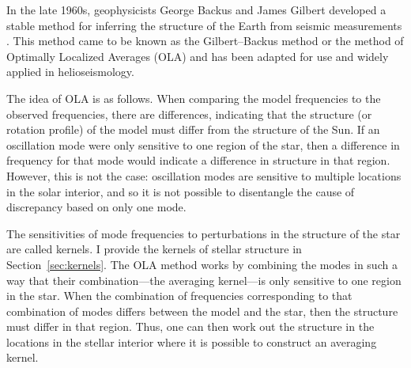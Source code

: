 In the late 1960s, geophysicists George Backus and James Gilbert developed a stable method for inferring the structure of the Earth from seismic measurements  \citep{1968GeoJ...16..169B, 1970RSPTA.266..123B}. 
This method came to be known as the Gilbert--Backus method or the method of Optimally Localized Averages (OLA) and has been adapted for use and widely applied in helioseismology. %

The idea of OLA is as follows. 
When comparing the model frequencies to the observed frequencies, there are differences, indicating that the structure (or rotation profile) of the model must differ from the structure of the Sun. 
If an oscillation mode were only sensitive to one region of the star, then a difference in frequency for that mode would indicate a difference in structure in that region. 
However, this is not the case: oscillation modes are sensitive to multiple locations in the solar interior, and so it is not possible to disentangle the cause of discrepancy based on only one mode. 

The sensitivities of mode frequencies to perturbations in the structure of the star are called kernels. 
I provide the kernels of stellar structure in Section~\ref{sec:kernels}. 
The OLA method works by combining the modes in such a way that their combination---the averaging kernel---is only sensitive to one region in the star. 
When the combination of frequencies corresponding to that combination of modes differs between the model and the star, then the structure must differ in that region. 
Thus, one can then work out the structure in the locations in the stellar interior where it is possible to construct an averaging kernel. 


